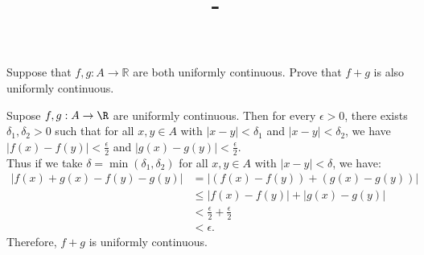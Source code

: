 \documentclass[answers,12pt,addpoints]{exam}
\author{\name}
\title{\course \ - \assignment}
\begin{document}
\maketitle

\begin{questions}
    \question Suppose that \(f, g : A \to \mathbb{R}\) are both uniformly continuous. Prove that \(f + g\) is also uniformly continuous.
    \begin{solution}
    Supose $f, g: A \to \R$ are uniformly continuous. Then for every $\epsilon > 0$, there exists $\delta_1, \delta_2 > 0$ such that for all $x, y \in A$ with $|x - y| < \delta_1$ and $|x - y| < \delta_2$, we have $|f(x) - f(y)| < \frac{\epsilon}{2}$ and $|g(x) - g(y)| < \frac{\epsilon}{2}$.\\
    Thus if we take $\delta = \min(\delta_1, \delta_2) $ for all $x, y \in A$ with $|x - y| < \delta $, we have:
\begin{align*}
    |f(x) + g(x) - f(y) - g(y)| & = |(f(x) - f(y)) + (g(x) - g(y))| \\
    & \leq |f(x) - f(y)| + |g(x) - g(y)| \\
    & < \frac{\epsilon}{2} + \frac{\epsilon}{2} \\
    & < \epsilon.
\end{align*}
    Therefore, \(f + g\) is uniformly continuous.
    \end{solution}

    \question
\end{questions}
\end{document}
